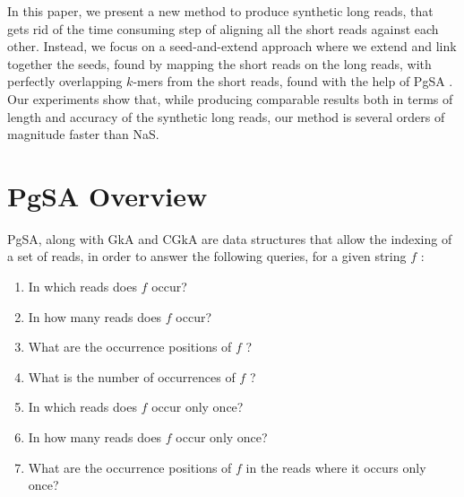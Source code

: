 \documentclass[twoside,twocolumn]{article}
\begin{document}
\indent In this paper, we present a new method to produce synthetic long reads, that gets rid of the time consuming step of aligning all
the short reads against each other. Instead, we focus on a seed-and-extend approach where we extend and link together the seeds, found by mapping
the short reads on the long reads, with perfectly overlapping $k$-mers from the short reads, found with the help of PgSA \cite{Kowalski2015}. \\
\indent Our experiments show that, while producing comparable results both in terms of length and accuracy of the synthetic long reads, our method is several orders of magnitude faster than NaS. 

\section{PgSA Overview}

PgSA, along with GkA \cite{Philippe2011} and CGkA \cite{Niko2013} are data structures that allow the indexing of a set of reads, in order
to answer the following queries, for a given string $f$ : \\

\begin{enumerate}
	\item In which reads does $f$ occur?
	\item In how many reads does $f$ occur?
	\item What are the occurrence positions of $f$ ?
	\item What is the number of occurrences of $f$ ?
	\item In which reads does $f$ occur only once?
	\item In how many reads does $f$ occur only once?
	\item What are the occurrence positions of $f$ in the reads where it occurs only once?
\end{enumerate}
\end{document}
